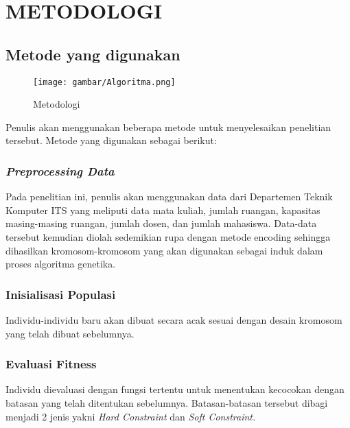   \chapter{METODOLOGI}


\section{Metode yang digunakan}

\begin{figure} [ht] \centering
  \texttt{[image: gambar/Algoritma.png]}
  \caption{Metodologi}
  \label{fig:Blueprint}
\end{figure}

Penulis akan menggunakan beberapa metode untuk menyelesaikan penelitian tersebut. 
Metode yang digunakan sebagai berikut:

\subsection{\emph{Preprocessing Data}}
  
  Pada penelitian ini, penulis akan menggunakan data dari Departemen Teknik Komputer ITS yang meliputi data mata kuliah, 
  jumlah ruangan, kapasitas masing-masing ruangan, jumlah dosen, dan jumlah mahasiswa. Data-data tersebut kemudian diolah 
  sedemikian rupa dengan metode encoding sehingga dihasilkan kromosom-kromosom yang akan digunakan sebagai induk dalam proses algoritma genetika.
  
\subsection{Inisialisasi Populasi}
  
  Individu-individu baru akan dibuat secara acak sesuai dengan desain kromosom yang telah dibuat sebelumnya.
  
  \subsection{Evaluasi Fitness}
  
  Individu dievaluasi dengan fungsi tertentu untuk menentukan kecocokan dengan batasan yang telah ditentukan sebelumnya. 
  Batasan-batasan tersebut dibagi menjadi 2 jenis yakni \emph{Hard Constraint} dan \emph{Soft Constraint.}
 
